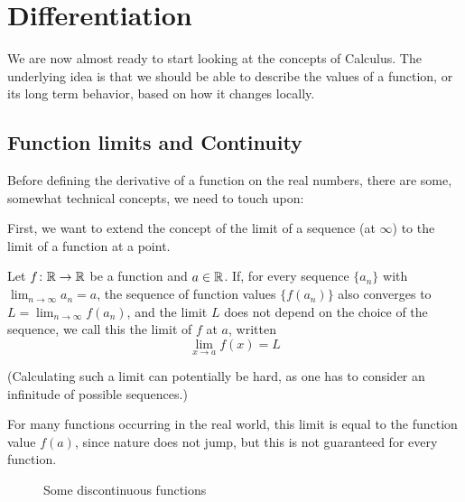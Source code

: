 \chapter{Differentiation}
\label{chdiff}

We are now almost ready to start looking at the concepts of Calculus. The
underlying idea is that we should be able to describe the values of a
function, or its long term behavior, based on how it changes locally.

\section{Function limits and Continuity}

Before defining the derivative of a function on the real numbers, 
there are some, somewhat
technical concepts, we need to touch upon:

First, we want to extend the concept of the limit of a sequence (at
$\infty$) to the limit of a function at a point.
\begin{defn}
Let $f\colon{\mathbb R}\to{\mathbb R}$ be a function and $a\in{\mathbb R}$. If, for every sequence
$\{a_n\}$ with $\lim_{n\to\infty} a_n=a$, the sequence of function values
$\{f(a_n)\}$ also converges to $L=\lim_{n\to\infty} f(a_n)$, and the limit
$L$ does not depend on the choice of the sequence, we call this the limit
of $f$ at $a$, written
\[
\lim_{x\to a} f(x)=L
\]
\end{defn}

(Calculating such a limit can potentially be hard, as one has to consider an
infinitude of possible sequences.)

For many functions occurring in the real world, this limit is equal to the
function value $f(a)$, since nature does not jump, but this is not
guaranteed for every function.

\begin{figure}[t]
\begin{center}
\end{center}
\caption{Some discontinuous functions}
\label{figdiscont}
\end{figure}

